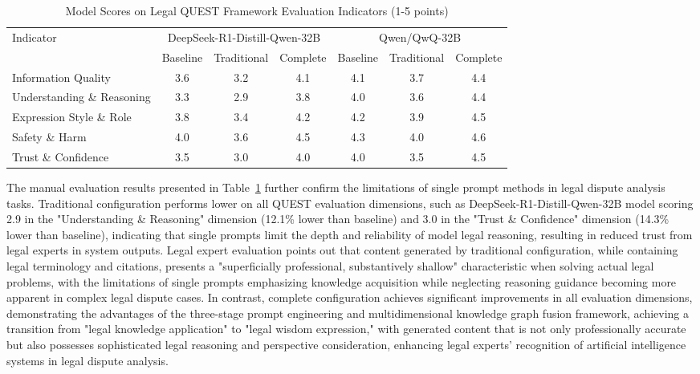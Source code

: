 \documentclass{article}
\theoremstyle{plain}
\theoremstyle{definition}
\begin{document}
\begin{table}[htbp]
\centering
\caption{Model Scores on Legal QUEST Framework Evaluation Indicators (1-5 points)}
\label{tab4}
\renewcommand{\arraystretch}{1.2}
\begin{tabularx}{\textwidth}{X *{6}{c}}
\toprule
\multirow{2}{*}{Indicator} & \multicolumn{3}{c}{DeepSeek-R1-Distill-Qwen-32B} & \multicolumn{3}{c}{Qwen/QwQ-32B} \\
\cmidrule(lr){2-4} \cmidrule(lr){5-7}
 & Baseline & Traditional & Complete & Baseline & Traditional & Complete \\
\midrule
Information Quality & 3.6 & 3.2 & 4.1 & 4.1 & 3.7 & 4.4 \\
Understanding \& Reasoning & 3.3 & 2.9 & 3.8 & 4.0 & 3.6 & 4.4 \\
Expression Style \& Role & 3.8 & 3.4 & 4.2 & 4.2 & 3.9 & 4.5 \\
Safety \& Harm & 4.0 & 3.6 & 4.5 & 4.3 & 4.0 & 4.6 \\
Trust \& Confidence & 3.5 & 3.0 & 4.0 & 4.0 & 3.5 & 4.5 \\
\bottomrule
\end{tabularx}
\end{table}

The manual evaluation results presented in Table~\ref{tab4} further confirm the limitations of single prompt methods in legal dispute analysis tasks. Traditional configuration performs lower on all QUEST evaluation dimensions, such as DeepSeek-R1-Distill-Qwen-32B model scoring 2.9 in the "Understanding \& Reasoning" dimension (12.1\% lower than baseline) and 3.0 in the "Trust \& Confidence" dimension (14.3\% lower than baseline), indicating that single prompts limit the depth and reliability of model legal reasoning, resulting in reduced trust from legal experts in system outputs. Legal expert evaluation points out that content generated by traditional configuration, while containing legal terminology and citations, presents a "superficially professional, substantively shallow" characteristic when solving actual legal problems, with the limitations of single prompts emphasizing knowledge acquisition while neglecting reasoning guidance becoming more apparent in complex legal dispute cases. In contrast, complete configuration achieves significant improvements in all evaluation dimensions, demonstrating the advantages of the three-stage prompt engineering and multidimensional knowledge graph fusion framework, achieving a transition from "legal knowledge application" to "legal wisdom expression," with generated content that is not only professionally accurate but also possesses sophisticated legal reasoning and perspective consideration, enhancing legal experts' recognition of artificial intelligence systems in legal dispute analysis.
\end{document}
